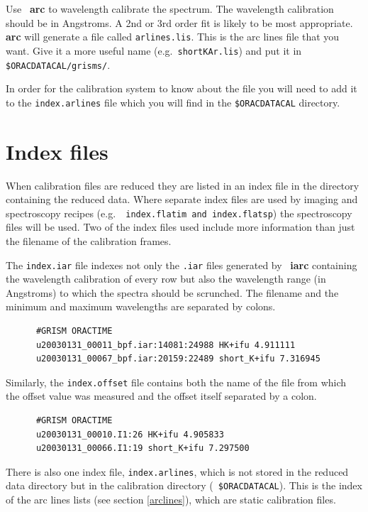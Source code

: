 \documentclass[twoside,11pt]{article}
\newcommand{\xref}[3]{#1}
\renewcommand{\_}{\texttt{\symbol{95}}}
\newcommand{\FIGARO}{\xref{{\sc{Figaro}}}{sun86}{}}
\begin{document}
Use \FIGARO\ \xref{{\bf arc}}{sun86}{ARC} to wavelength calibrate the
spectrum. The wavelength calibration should be in Angstroms. A 2nd or
3rd order fit is likely to be most appropriate. \xref{{\bf
    arc}}{sun86}{ARC} will generate a file called {\tt arlines.lis}.
This is the arc lines file that you want. Give it a more useful name
(e.g.\ {\tt short\_K\_Ar.lis}) and put it in {\tt
  \$ORAC\_DATA\_CAL/grisms/}.

In order for the calibration system to know about the file you will
need to add it to the {\tt index.arlines} file which you will find in
the {\tt \$ORAC\_DATA\_CAL} directory.

\section{Index files}

When calibration files are reduced they are listed in an index file in
the directory containing the reduced data. Where separate index files
are used by imaging and spectroscopy recipes (e.g.\ {\tt
  index.flat\_im and index.flat\_sp}) the spectroscopy files will be
used. Two of the index files used include more information than just
the filename of the calibration frames.

The {\tt index.iar} file indexes not only the {\tt .iar} files
generated by \FIGARO\ \xref{{\bf iarc}}{sun86}{IARC} containing the
wavelength calibration of every row but also the wavelength range (in
Angstroms) to which the spectra should be scrunched. The filename and
the minimum and maximum wavelengths are separated by colons.

\begin{verbatim}
      #GRISM ORACTIME
      u20030131_00011_bpf.iar:14081:24988 HK+ifu 4.911111
      u20030131_00067_bpf.iar:20159:22489 short_K+ifu 7.316945
\end{verbatim}

Similarly, the {\tt index.offset} file contains both the name of the
file from which the offset value was measured and the offset itself
separated by a colon.

\begin{verbatim}
      #GRISM ORACTIME
      u20030131_00010.I1:26 HK+ifu 4.905833
      u20030131_00066.I1:19 short_K+ifu 7.297500
\end{verbatim}

There is also one index file, {\tt index.arlines}, which is not stored
in the reduced data directory but in the calibration directory ({\tt
  \$ORAC\_DATA\_CAL}). This is the index of the arc lines lists (see
section \ref{arclines}), which are static calibration files.
\end{document}
